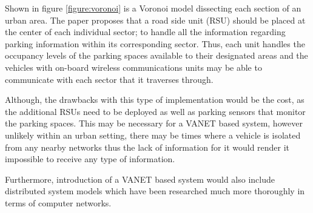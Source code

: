Shown in figure \ref{figure:voronoi} is a Voronoi model dissecting each section of an urban area. The paper proposes that a road side unit (RSU) should be placed at the center of each individual sector; to handle all the information regarding parking information within its corresponding sector. Thus, each unit handles the occupancy levels of the parking spaces available to their designated areas and the vehicles with on-board wireless communications units may be able to communicate with each sector that it traverses through.

Although, the drawbacks with this type of implementation would be the cost, as the additional RSUs need to be deployed as well as parking sensors that monitor the parking spaces. This may be necessary for a VANET based system, however unlikely within an urban setting, there may be times where a vehicle is isolated from any nearby networks thus the lack of information for it would render it impossible to receive any type of information.

Furthermore, introduction of a VANET based system would also include distributed system models which have been researched much more thoroughly in terms of computer networks.